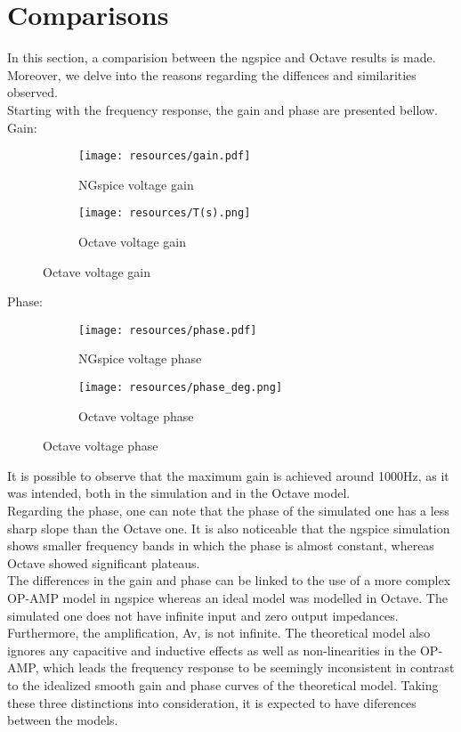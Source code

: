\section{Comparisons}
\label{sec:comparsisons}

In this section, a comparision between the ngspice and Octave results is made. Moreover, we delve into the reasons regarding the diffences and similarities observed.\\
Starting with the frequency response, the gain and phase are presented bellow.\\
\FloatBarrier
Gain:
\begin{figure} [htb] 
	\begin{subfigure}[b]{0.5\textwidth}
		\centering
  		\texttt{[image: resources/gain.pdf]}
  		\caption{NGspice voltage gain}
	\end{subfigure}
  	\begin{subfigure}[b]{0.5\textwidth}
  		\centering
 		 \texttt{[image: resources/T(s).png]}
 		 \caption{Octave voltage gain}
  	\end{subfigure}
\end{figure}
\FloatBarrier
Phase:
\begin{figure} [htb] 
	\begin{subfigure}[b]{0.5\textwidth}
 		 \texttt{[image: resources/phase.pdf]}
  		\caption{NGspice voltage phase}
 		\label{fig:theoplots}
	\end{subfigure}
  	\begin{subfigure}[b]{0.5\textwidth}
  		\texttt{[image: resources/phase\_deg.png]}
 		 \caption{Octave voltage phase}
 		 \label{fig:theoplots}
  	\end{subfigure}
\end{figure}
\FloatBarrier
It is possible to observe that the maximum gain is achieved around 1000Hz, as it was intended, both in the simulation and in the Octave model.\\
Regarding the phase, one can note that the phase of the simulated one has a less sharp slope than the Octave one. It is also noticeable that the ngspice simulation shows smaller frequency bands in which the phase is almost constant, whereas Octave showed significant plateaus.\\
The differences in the gain and phase can be linked to the use of a more complex OP-AMP model in ngspice whereas an ideal model was modelled in Octave. The simulated one does not have infinite input and zero output impedances. Furthermore, the amplification, Av, is not infinite. The theoretical model also ignores any capacitive and inductive effects as well as non-linearities in the OP-AMP, which leads the frequency response to be seemingly inconsistent in contrast to the idealized smooth gain and phase curves of the theoretical model. Taking these three distinctions into consideration, it is expected to have diferences between the models.\\
